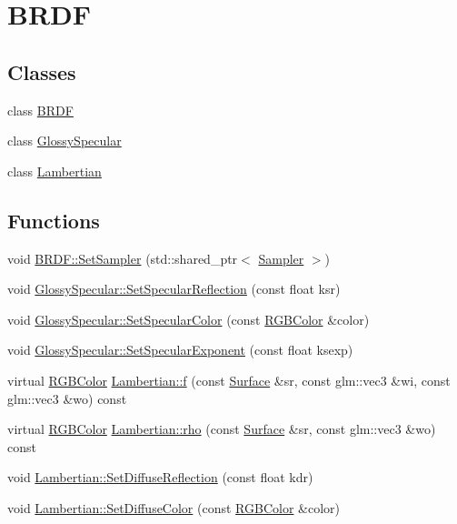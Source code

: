 \hypertarget{group___b_r_d_f}{}\section{B\+R\+DF}
\label{group___b_r_d_f}
\subsection*{Classes}
\begin{DoxyCompactItemize}
\item 
class \hyperlink{class_b_r_d_f}{B\+R\+DF}
\item 
class \hyperlink{class_glossy_specular}{Glossy\+Specular}
\item 
class \hyperlink{class_lambertian}{Lambertian}
\end{DoxyCompactItemize}
\subsection*{Functions}
\begin{DoxyCompactItemize}
\item 
void \hyperlink{group___b_r_d_f_ga77a2a5e48ca3093d853e5713afa01108}{B\+R\+D\+F\+::\+Set\+Sampler} (std\+::shared\+\_\+ptr$<$ \hyperlink{class_sampler}{Sampler} $>$)
\item 
void \hyperlink{group___b_r_d_f_gab7e40f362680b631c40530c9c605e3b3}{Glossy\+Specular\+::\+Set\+Specular\+Reflection} (const float ksr)
\item 
void \hyperlink{group___b_r_d_f_ga4bc78448419beb3d49ae4a9d96a8c5ad}{Glossy\+Specular\+::\+Set\+Specular\+Color} (const \hyperlink{class_r_g_b_color}{R\+G\+B\+Color} \&color)
\item 
void \hyperlink{group___b_r_d_f_ga06b9d29c576be7fcacef68edb57cfc23}{Glossy\+Specular\+::\+Set\+Specular\+Exponent} (const float ksexp)
\item 
virtual \hyperlink{class_r_g_b_color}{R\+G\+B\+Color} \hyperlink{group___b_r_d_f_gad7b8c290aaacbe6c11ee62529dd7389b}{Lambertian\+::f} (const \hyperlink{class_surface}{Surface} \&sr, const glm\+::vec3 \&wi, const glm\+::vec3 \&wo) const
\item 
virtual \hyperlink{class_r_g_b_color}{R\+G\+B\+Color} \hyperlink{group___b_r_d_f_gaa70272886cbeb0f91c629ace938dd0a0}{Lambertian\+::rho} (const \hyperlink{class_surface}{Surface} \&sr, const glm\+::vec3 \&wo) const
\item 
void \hyperlink{group___b_r_d_f_ga4d1bf71e27d8eacc273d244e01fe2d46}{Lambertian\+::\+Set\+Diffuse\+Reflection} (const float kdr)
\item 
void \hyperlink{group___b_r_d_f_gadd1e0590ffcada37b485b985182439de}{Lambertian\+::\+Set\+Diffuse\+Color} (const \hyperlink{class_r_g_b_color}{R\+G\+B\+Color} \&color)
\end{DoxyCompactItemize}


